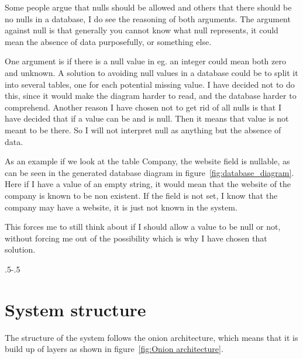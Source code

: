 Some people argue that nulls should be allowed and others that there should be
no nulls in a database\cite{stackexchange:db:nullfields}, I do see the reasoning
of both arguments. The argument against null is that generally you cannot know
what null represents, it could mean the absence of data purposefully, or
something else.

One argument is if there is a null value in eg. an integer could mean both zero
and unknown. A solution to avoiding null values in a database could be to split
it into several tables, one for each potential missing value. I have decided not
to do this, since it would make the diagram harder to read, and the database
harder to comprehend. Another reason I have chosen not to get rid of all nulls
is that I have decided that if a value can be and is null. Then it means that
value is not meant to be there. So I will not interpret null as anything but the
absence of data.

As an example if we look at the table Company, the website field is nullable, as
can be seen in the generated database diagram in figure~\ref{fig:database_diagram}.
Here if I have a value of an empty string, it would mean that the website of
the company is known to be non existent. If the field is not set, I know that
the company may have a website, it is just not known in the system.

This forces me to still think about if I should allow a value to be null or not,
without forcing me out of the possibility which is why I have chosen that
solution. 

\clearpage
{\pdfpagewidth
    \vspace*{-2cm}
    \noindent\kern.5\pdfpagewidth{}\kern-.5\pdfpagewidth 
     \par
     \vspace*{-5cm}
\clearpage
}
\section{System structure}
\label{sec:System structure}
The structure of the system follows the onion
architecture\cite{onion_architecture}, which means that it is build up of layers
as shown in figure~\ref{fig:Onion architecture}. 


